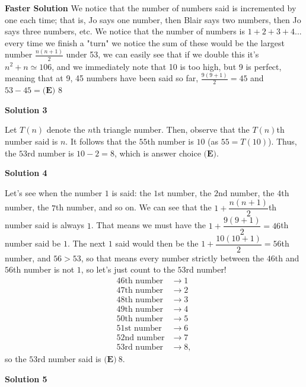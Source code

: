 \begin{enumerate}
 \textbf{Faster Solution} We notice that the number of numbers said is incremented by one each time; that is, Jo says one number, then Blair says two numbers, then Jo says three numbers, etc.  We notice that the number of numbers is $1 + 2 + 3 + 4 ...$ every time we finish a "turn" we notice the sum of these would be the largest number $\frac{n(n+1)}{2}$ under 53, we can easily see that if we double this it's $n^2 + n \simeq 106$, and we immediately note that 10 is too high, but 9 is perfect, meaning that at 9, 45 numbers have been said so far, $\frac{9(9+1)}{2} = 45$ and $53 - 45 = \boxed{\textbf{(E) }8}$




\textbf{Solution 3}

Let $T(n)$ denote the $n$th triangle number. Then, observe that the $T(n)$th number said is $n$. It follows that the $55$th number is $10$ (as $55 = T(10)$). Thus, the $53$rd number is $10 - 2 = 8$, which is answer choice $\boxed{\textbf{(E)}}$.

 



\textbf{Solution 4}

Let's see when the number $1$ is said: the $1$st number, the $2$nd number, the $4$th number, the $7$th number, and so on. We can see that the $1+\dfrac{n(n+1)}2$th number said is always $1$. That means we must have the $1+\dfrac{9(9+1)}2=46$th number said be $1$. The next $1$ said would then be the $1+\dfrac{10(10+1)}2=56$th number, and $56>53$, so that means every number strictly between the $46$th and $56$th number is not $1$, so let's just count to the $53$rd number!
 \begin{align*}     46\text{th number}&\rightarrow 1\\     47\text{th number}&\rightarrow 2\\     48\text{th number}&\rightarrow 3\\     49\text{th number}&\rightarrow 4\\     50\text{th number}&\rightarrow 5\\     51\text{st number}&\rightarrow 6\\     52\text{nd number}&\rightarrow 7\\     53\text{rd number}&\rightarrow 8, \end{align*}
so the $53$rd number said is $\boxed{\textbf{(E)}\ 8}$.

 



\textbf{Solution 5}


\end{enumerate}
